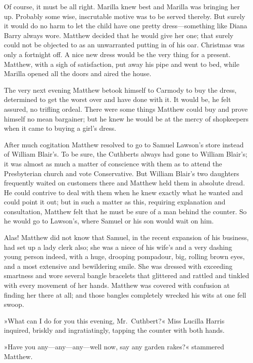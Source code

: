 Of course, it must be all right. Marilla knew best and Marilla was bringing her up. Probably some wise, inscrutable motive was to be served thereby. But surely it would do no harm to let the child have one pretty dress—something like Diana Barry always wore. Matthew decided that he would give her one; that surely could not be objected to as an unwarranted putting in of his oar. Christmas was only a fortnight off. A nice new dress would be the very thing for a present. Matthew, with a sigh of satisfaction, put away his pipe and went to bed, while Marilla opened all the doors and aired the house.

The very next evening Matthew betook himself to Carmody to buy the dress, determined to get the worst over and have done with it. It would be, he felt assured, no trifling ordeal. There were some things Matthew could buy and prove himself no mean bargainer; but he knew he would be at the mercy of shopkeepers when it came to buying a girl's dress.

After much cogitation Matthew resolved to go to Samuel Lawson's store instead of William Blair's. To be sure, the Cuthberts always had gone to William Blair's; it was almost as much a matter of conscience with them as to attend the Presbyterian church and vote Conservative. But William Blair's two daughters frequently waited on customers there and Matthew held them in absolute dread. He could contrive to deal with them when he knew exactly what he wanted and could point it out; but in such a matter as this, requiring explanation and consultation, Matthew felt that he must be sure of a man behind the counter. So he would go to Lawson's, where Samuel or his son would wait on him.

Alas! Matthew did not know that Samuel, in the recent expansion of his business, had set up a lady clerk also; she was a niece of his wife's and a very dashing young person indeed, with a huge, drooping pompadour, big, rolling brown eyes, and a most extensive and bewildering smile. She was dressed with exceeding smartness and wore several bangle bracelets that glittered and rattled and tinkled with every movement of her hands. Matthew was covered with confusion at finding her there at all; and those bangles completely wrecked his wits at one fell swoop.

»What can I do for you this evening, Mr.~Cuthbert?« Miss Lucilla Harris inquired, briskly and ingratiatingly, tapping the counter with both hands.

»Have you any—any—any—well now, say any garden rakes?« stammered Matthew.

